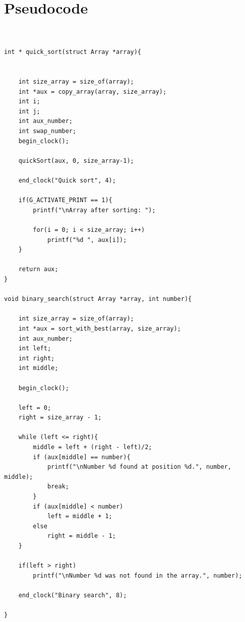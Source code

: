 \documentclass{article}
\begin{document}
\section{Pseudocode}
\begin{center}

\begin{lstlisting}


int * quick_sort(struct Array *array){


    int size_array = size_of(array);
    int *aux = copy_array(array, size_array);
    int i;
    int j;
    int aux_number;
    int swap_number;
    begin_clock();

    quickSort(aux, 0, size_array-1);

    end_clock("Quick sort", 4);

    if(G_ACTIVATE_PRINT == 1){
        printf("\nArray after sorting: ");

        for(i = 0; i < size_array; i++)
            printf("%d ", aux[i]);
    }

    return aux;
}

void binary_search(struct Array *array, int number){

    int size_array = size_of(array);
    int *aux = sort_with_best(array, size_array);
    int aux_number;
    int left;
    int right;
    int middle;

    begin_clock();

    left = 0;
    right = size_array - 1;

    while (left <= right){
        middle = left + (right - left)/2;
        if (aux[middle] == number){
            printf("\nNumber %d found at position %d.", number, middle);
            break;
        }
        if (aux[middle] < number)
            left = middle + 1;
        else
            right = middle - 1;
    }

    if(left > right)
        printf("\nNumber %d was not found in the array.", number);

    end_clock("Binary search", 8);

}


\end{lstlisting}
\end{center}
\end{document}
